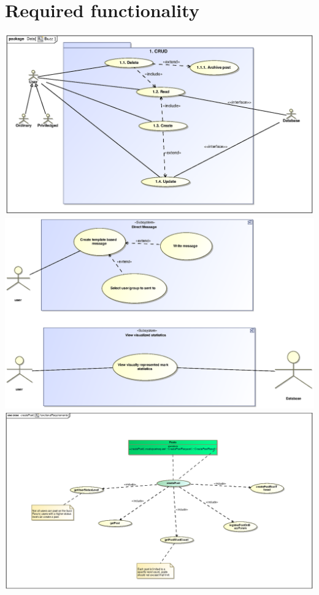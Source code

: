 \documentclass{scrreprt}
\begin{document}
\chapter{Required functionality} 							%
\includegraphics[scale=.9]{CRUDUSECASE.eps}\\
\includegraphics[scale=.9]{seanUC.eps}\\
\includegraphics[scale=.9]{Shaun_functionalRequirements.eps}\\
\end{document}
